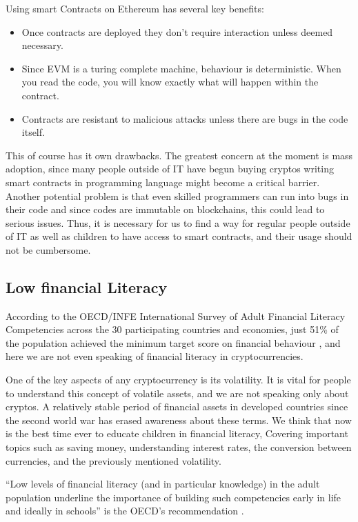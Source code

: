 \documentclass[english]{article}
\begin{document}
Using smart Contracts on Ethereum has several key benefits:

\begin{itemize}
  \item Once contracts are deployed they don’t require interaction unless deemed necessary.
  \item Since EVM is a  turing complete machine, behaviour is deterministic. When you read the code, you will know exactly what will happen within the contract.
  \item Contracts are resistant to malicious attacks unless there are bugs in the code itself.
\end{itemize}

This of course has it own drawbacks. The greatest concern at the moment is  mass adoption, since many people outside of IT have begun buying cryptos  writing smart contracts in programming language might become a critical barrier. Another potential  problem is that even skilled programmers can run into bugs in their code and since codes are immutable on blockchains, this could lead to serious issues. Thus, it is necessary for us to find a way for regular people outside of IT as well as children to have access to smart contracts, and their usage should not be cumbersome. 

\subsection{Low financial Literacy}
According to the OECD/INFE International Survey of Adult Financial Literacy Competencies across the 30 participating countries and economies, just 51\% of the population achieved the minimum target score on financial behaviour \cite{oecd2016}, and here we are not even speaking of financial literacy in cryptocurrencies.

One of the key aspects of any cryptocurrency is its volatility. It is vital for people to understand this concept of volatile assets, and we are not speaking only about cryptos. A relatively stable period of financial assets in developed countries since the second world war has erased awareness about these terms. We think that now is the best time ever to educate children in financial literacy, Covering important topics such as saving money, understanding interest rates, the conversion between currencies, and the previously mentioned volatility. 

“Low levels of financial literacy (and in particular knowledge) in the adult population underline the importance of building such competencies early in life and ideally in schools” is the OECD’s recommendation \cite{oecd2016}.
\end{document}
